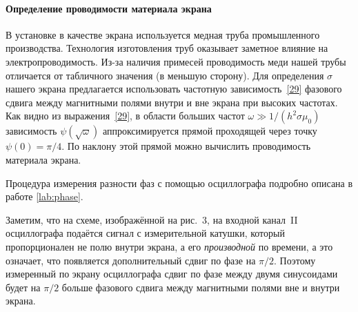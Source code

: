 
\paragraph{Определение проводимости материала экрана}

В установке в качестве экрана используется медная труба промышленного
производства. Технология изготовления труб оказывает заметное влияние
на электропроводимость. Из-за наличия примесей проводимость меди нашей
трубы отличается от табличного значения (в меньшую сторону).
Для определения $\sigma$ нашего экрана предлагается использовать
частотную зависимость~\eqref{29} фазового сдвига между магнитными полями
внутри и вне экрана при высоких частотах. Как видно из выражения~\eqref{29},
в области больших частот $\omega \gg 1/(h^2\sigma\mu_0)$ зависимость
$\psi(\sqrt{\omega})$ аппроксимируется прямой проходящей
через точку $\psi(0)=\pi/4$.
По наклону этой прямой можно вычислить проводимость материала экрана.

Процедура измерения разности фаз с помощью осциллографа
подробно описана в работе \ref{lab:phase}.

Заметим, что на схеме, изображённой на рис.~3, на входной канал~II
осциллографа подаётся сигнал с измерительной катушки, который пропорционален
не полю внутри экрана, а его \emph{производной} по времени, а это означает,
что появляется дополнительный сдвиг по фазе на $\pi/2$. Поэтому измеренный
по экрану осциллографа сдвиг по фазе между двумя синусоидами будет
на $\pi/2$ больше фазового сдвига между магнитными полями вне и
внутри экрана.



